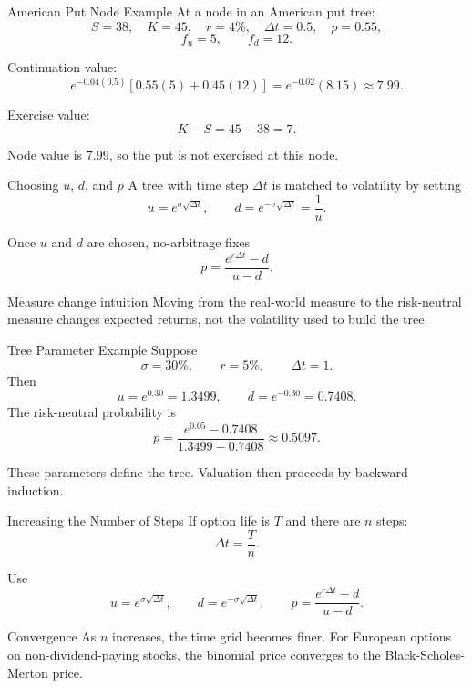 \documentclass[aspectratio=169,11pt]{beamer}
\begin{document}
\begin{frame}{American Put Node Example}
    At a node in an American put tree:
    \[
        S=38,\quad K=45,\quad r=4\%,\quad \Delta t=0.5,\quad p=0.55,
    \]
    \[
        f_u=5,\qquad f_d=12.
    \]

    Continuation value:
    \[
        e^{-0.04(0.5)}[0.55(5)+0.45(12)]
        =
        e^{-0.02}(8.15)
        \approx 7.99.
    \]

    Exercise value:
    \[
        K-S=45-38=7.
    \]

    Node value is \(7.99\), so the put is not exercised at this node.
\end{frame}

\begin{frame}{Choosing \(u\), \(d\), and \(p\)}
    A tree with time step \(\Delta t\) is matched to volatility by setting
    \[
        u=e^{\sigma\sqrt{\Delta t}},
        \qquad
        d=e^{-\sigma\sqrt{\Delta t}}=\frac{1}{u}.
    \]

    Once \(u\) and \(d\) are chosen, no-arbitrage fixes
    \[
        p=\frac{e^{r\Delta t}-d}{u-d}.
    \]

    \begin{alertblock}{Measure change intuition}
        Moving from the real-world measure to the risk-neutral measure changes expected returns, not the volatility used to build the tree.
    \end{alertblock}
\end{frame}

\begin{frame}{Tree Parameter Example}
    Suppose
    \[
        \sigma=30\%,
        \qquad
        r=5\%,
        \qquad
        \Delta t=1.
    \]
    Then
    \[
        u=e^{0.30}=1.3499,
        \qquad
        d=e^{-0.30}=0.7408.
    \]
    The risk-neutral probability is
    \[
        p=\frac{e^{0.05}-0.7408}{1.3499-0.7408}
        \approx 0.5097.
    \]

    These parameters define the tree. Valuation then proceeds by backward induction.
\end{frame}

\begin{frame}{Increasing the Number of Steps}
    If option life is \(T\) and there are \(n\) steps:
    \[
        \Delta t=\frac{T}{n}.
    \]

    Use
    \[
        u=e^{\sigma\sqrt{\Delta t}},
        \qquad
        d=e^{-\sigma\sqrt{\Delta t}},
        \qquad
        p=\frac{e^{r\Delta t}-d}{u-d}.
    \]

    \begin{block}{Convergence}
        As \(n\) increases, the time grid becomes finer.
        For European options on non-dividend-paying stocks, the binomial price converges to the Black-Scholes-Merton price.
    \end{block}
\end{frame}
\end{document}

